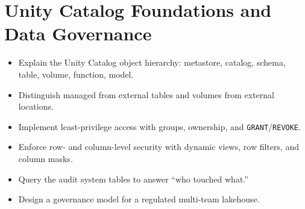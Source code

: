 \chapter{Unity Catalog Foundations and Data Governance}
%
%
\begin{objectives}
\begin{itemize}
    \item Explain the Unity Catalog object hierarchy: metastore, catalog, schema, table, volume, function, model.
    \item Distinguish managed from external tables and volumes from external locations.
    \item Implement least-privilege access with groups, ownership, and \texttt{GRANT}/\texttt{REVOKE}.
    \item Enforce row- and column-level security with dynamic views, row filters, and column masks.
    \item Query the audit system tables to answer ``who touched what.''
    \item Design a governance model for a regulated multi-team lakehouse.
\end{itemize}
\end{objectives}

